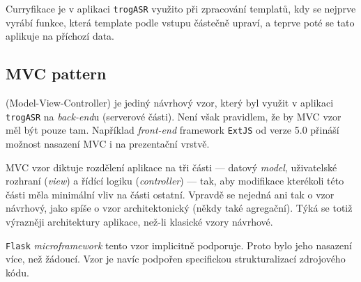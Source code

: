 Curryfikace je v aplikaci \verb|trogASR| využito při zpracování templatů, kdy se nejprve vyrábí funkce, která template podle vstupu částečně upraví, a teprve poté se tato aplikuje na příchozí data.

\subsection{MVC pattern}

 (Model-View-Controller) je jediný návrhový vzor, který byl využit v aplikaci \verb|trogASR| na {\sl back-end}u (serverové části). Není však pravidlem, že by MVC vzor měl být pouze tam. Například {\sl front-end} framework \verb|ExtJS| od verze 5.0 přináší možnost nasazení MVC i na prezentační vrstvě.

MVC vzor diktuje rozdělení aplikace na tři části --- datový {\sl model}, uživatelské rozhraní ({\sl view}) a řídící logiku ({\sl controller}) --- tak, aby modifikace kterékoli této části měla minimální vliv na části ostatní. Vpravdě se nejedná ani tak o vzor návrhový, jako spíše o vzor architektonický (někdy také agregační). Týká se totiž výrazněji architektury aplikace, než-li klasické vzory návrhové.

\verb|Flask| {\sl microframework} tento vzor implicitně podporuje. Proto bylo jeho nasazení více, než žádoucí. Vzor je navíc podpořen specifickou strukturalizací zdrojového kódu.